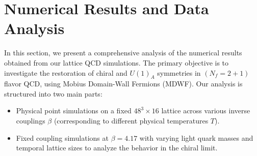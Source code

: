 \section{Numerical Results and Data Analysis}
\label{sec:data_analysis}

In this section, we present a comprehensive analysis of the numerical results obtained from our lattice QCD simulations. The primary objective is to investigate the restoration of chiral and $U(1)_A$ symmetries in $(N_f=2+1)$ flavor QCD, using Mobius Domain-Wall Fermions (MDWF). Our analysis is structured into two main parts:
\begin{itemize}
    \item Physical point simulations on a fixed $48^3 \times 16$ lattice across various inverse couplings $\beta$ (corresponding to different physical temperatures $T$).
    \item Fixed coupling simulations at $\beta=4.17$ with varying light quark masses and temporal lattice sizes to analyze the behavior in the chiral limit.
\end{itemize}

